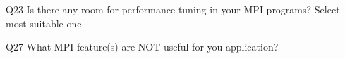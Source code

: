 \begin{description}%
\item{Q23} Is there any room for performance tuning in your MPI programs? Select most suitable one.%
\item{Q27} What MPI feature(s) are NOT useful for you application?%
\end{description}%

